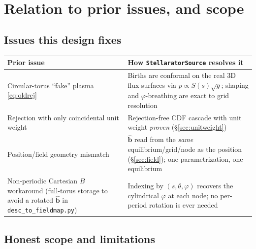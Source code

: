 \documentclass[11pt]{article}
\newcommand{\sg}{\sqrt{g}}
\newcommand{\bhat}{\hat{\mathbf{b}}}
\newcommand{\code}[1]{\texttt{#1}}
\begin{document}
\section{Relation to prior issues, and scope}
\label{sec:scope}

\subsection{Issues this design fixes}

\begin{center}
\begin{tabular}{p{}p{}}
\hline
Prior issue & How \code{StellaratorSource} resolves it\\
\hline
Circular-torus ``fake'' plasma \eqref{eq:oldrej} & Births are conformal on the real
3D flux surfaces via $p\propto S(s)\sg$; shaping and $\varphi$-breathing are exact to
grid resolution\\[2pt]
Rejection with only coincidental unit weight & Rejection-free CDF cascade with unit
weight \emph{proven} (\S\ref{sec:unitweight})\\[2pt]
Position/field geometry mismatch & $\bhat$ read from the \emph{same}
equilibrium/grid/node as the position (\S\ref{sec:field}); one parametrization, one
equilibrium\\[2pt]
Non-periodic Cartesian $B$ workaround (full-torus storage to avoid a rotated
$\bhat$ in \code{desc\_to\_fieldmap.py}) & Indexing by $(s,\theta,\varphi)$ recovers
the cylindrical $\varphi$ at each node; no per-period rotation is ever needed\\
\hline
\end{tabular}
\end{center}

\subsection{Honest scope and limitations}
\end{document}

